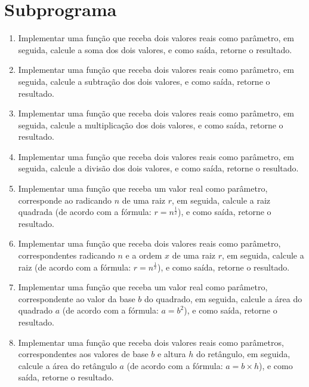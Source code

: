 \documentclass[11pt]{article}
\begin{document}
\newpage

\section{Subprograma}

\begin{enumerate}
	\item Implementar uma função que receba dois valores reais como parâmetro, em seguida, calcule a
	soma dos dois valores, e como saída, retorne o resultado.
	
	\item  Implementar uma função que receba dois valores reais como parâmetro, em seguida, calcule a
	subtração dos dois valores, e como saída, retorne o resultado.
	
	\item  Implementar uma função que receba dois valores reais como parâmetro, em seguida, calcule a
	multiplicação dos dois valores, e como saída, retorne o resultado.
	
	\item Implementar uma função que receba dois valores reais como parâmetro, em seguida, calcule a
	divisão dos dois valores, e como saída, retorne o resultado.
	
	\item Implementar uma função que receba um valor real como parâmetro, corresponde ao radicando $n$
	de uma raiz $r$, em seguida, calcule a raiz quadrada (de acordo com a fórmula: $r = n^{\frac{1}{2}}$), e como
	saída, retorne o resultado.
	
	\item  Implementar uma função que receba dois valores reais como parâmetro, correspondentes
	radicando $n$ e a ordem $x$ de uma raiz $r$, em seguida, calcule a raiz (de acordo com a fórmula:
	$r = n^{\frac{1}{x}}$), e como saída, retorne o resultado.
	
	\item Implementar uma função que receba um valor real como parâmetro, correspondente ao valor da
	base $b$ do quadrado, em seguida, calcule a área do quadrado $a$ (de acordo com a fórmula: $a = b^{2}$),
	e como saída, retorne o resultado.
	
	\item  Implementar uma função que receba dois valores reais como parâmetros, correspondentes aos
	valores de base $b$ e altura $h$ do retângulo, em seguida, calcule a área do retângulo $a$ (de acordo
	com a fórmula: $a = b \times h$), e como saída, retorne o resultado.
	

\end{enumerate}
\end{document}
